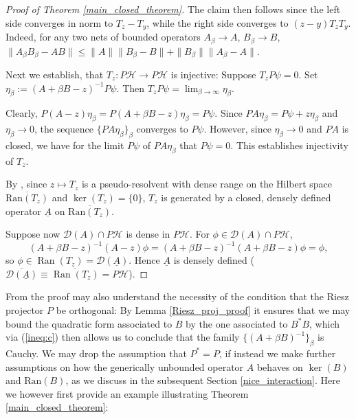 \documentclass[reqno,12pt,letterpaper]{amsart}
\numberwithin{equation}{section}
\newcommand{\1}{\mathds{1}}
\theoremstyle{definition}
\begin{document}
\begin{proof}[Proof of Theorem \ref{main_closed_theorem}]
	The claim then follows since the left side converges in norm to \(T_z - T_y\), while the right side converges to \((z - y) T_z T_y\).
	Indeed, for any two nets of bounded operators \(A_\beta \to A\), 
	\(B_\beta \to B\),
	$
	\| A_\beta B_\beta - A B \| \leq \|A\| \| B_\beta - B \| + \| B_\beta \| \| A_\beta - A \|.
	$
	
	Next we establish, that \(T_z : P \mathcal{H} \to P \mathcal{H}\) is injective: Suppose \(T_z P \psi = 0\). Set \(\eta_\beta := (A + \beta B - z)^{-1} P \psi\).  Then \(T_z P \psi = \lim_{\beta \to \infty} \eta_\beta\). 
	
	
	
	Clearly, \( P(A - z)\eta_\beta = P(A + \beta B - z) \eta_\beta = P \psi \). Since \( PA \eta_\beta = P \psi + z \eta_\beta \) and \( \eta_\beta \rightarrow 0 \), the sequence \( \{PA \eta_\beta\}_\beta \) converges to \( P \psi \). However, since \( \eta_\beta \rightarrow 0 \) and \( PA \) is closed, we have for the limit \( P \psi \) of \( PA \eta_\beta \) that
	$
	P \psi = 0.
	$
	This establishes injectivity of $T_z$.
	

	
	
	
	
	
	
	By \cite[Chapter VIII.4, Theorem 1]{yosida1968functional}, since \(z \mapsto T_z\) is a pseudo-resolvent with dense range  on the Hilbert space $\overline{\text{Ran}(T_z)}$ 
	and \(\ker(T_z) = \{0\}\), \(T_z\) is generated by a closed, densely defined operator \(\underline{A}\) on $\overline{\text{Ran}(T_z)}$.
	
	Suppose now \(\mathcal{D}(A) \cap P \mathcal{H}\) is dense in \(P \mathcal{H}\). For \(\phi \in \mathcal{D}(A) \cap P \mathcal{H}\),
	\[
	(A + \beta B - z)^{-1} (A - z) \phi = (A + \beta B - z)^{-1} (A + \beta B - z) \phi = \phi,
	\]
	so \(\phi \in \operatorname{Ran}(T_z) = \mathcal{D}(\underline{A})\). Hence \(\underline{A}\) is densely defined ($\overline{\mathcal{D}(\underline{A})} \equiv \overline{ \operatorname{Ran}(T_z)} = P\mathcal{H}$).
\end{proof}

From the proof may also understand the necessity of the condition that the Riesz projector $P$ be orthogonal: By Lemma \ref{Riesz_proj_proof} it ensures that  we may bound the quadratic form associated to $B$ by the one associated to $B^*B$, which via  (\ref{ineq:c}) then allows us to conclude that the family $\{(A + \beta B)^{-1}\}_\beta$ is Cauchy. We may drop the assumption that $P^* = P$, if instead we make further assumptions on how the generically unbounded operator $A$ behaves on $\ker(B)$ and $\text{Ran}(B)$, as we discuss in the subsequent Section \ref{nice_interaction}. Here we however first provide an example illustrating Theorem \ref{main_closed_theorem}:
\end{document}
